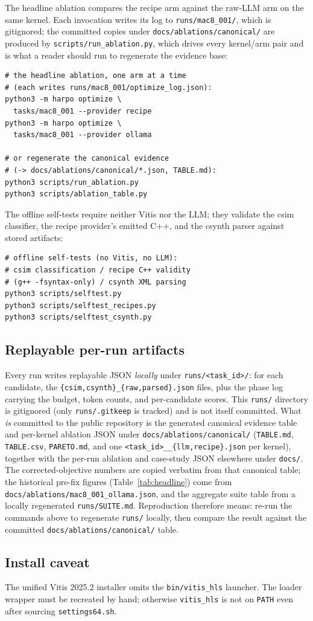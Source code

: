 The headline ablation compares the recipe arm against the raw-LLM arm on the
same kernel. Each invocation writes its log to \texttt{runs/mac8\_001/}, which is
gitignored; the committed copies under \texttt{docs/ablations/canonical/} are
produced by \texttt{scripts/run\_ablation.py}, which drives every kernel/arm pair
and is what a reader should run to regenerate the evidence base:

{\footnotesize
\begin{verbatim}
# the headline ablation, one arm at a time
# (each writes runs/mac8_001/optimize_log.json):
python3 -m harpo optimize \
  tasks/mac8_001 --provider recipe
python3 -m harpo optimize \
  tasks/mac8_001 --provider ollama

# or regenerate the canonical evidence
# (-> docs/ablations/canonical/*.json, TABLE.md):
python3 scripts/run_ablation.py
python3 scripts/ablation_table.py
\end{verbatim}}

The offline self-tests require neither Vitis nor the LLM; they validate the
csim classifier, the recipe provider's emitted C++, and the csynth parser
against stored artifacts:

{\footnotesize
\begin{verbatim}
# offline self-tests (no Vitis, no LLM):
# csim classification / recipe C++ validity
# (g++ -fsyntax-only) / csynth XML parsing
python3 scripts/selftest.py
python3 scripts/selftest_recipes.py
python3 scripts/selftest_csynth.py
\end{verbatim}}

\subsection{Replayable per-run artifacts}

Every run writes replayable JSON \emph{locally} under \texttt{runs/<task\_id>/}:
for each candidate, the \texttt{\{csim,csynth\}\_\{raw,parsed\}.json} files,
plus the phase log carrying the budget, token counts, and per-candidate
scores. This \texttt{runs/} directory is gitignored (only
\texttt{runs/.gitkeep} is tracked) and is not itself committed. What
\emph{is} committed to the public repository is the generated canonical
evidence table and per-kernel ablation JSON under
\texttt{docs/ablations/canonical/} (\texttt{TABLE.md}, \texttt{TABLE.csv},
\texttt{PARETO.md}, and one \texttt{<task\_id>\_\_\{llm,recipe\}.json} per
kernel), together with the per-run ablation and case-study JSON elsewhere under
\texttt{docs/}. The corrected-objective numbers are copied verbatim from that
canonical table; the historical pre-fix figures (Table~\ref{tab:headline}) come
from \texttt{docs/ablations/mac8\_001\_ollama.json}, and the aggregate suite
table from a locally regenerated \texttt{runs/SUITE.md}.
Reproduction therefore means: re-run the commands above to regenerate
\texttt{runs/} locally, then compare the result against the committed
\texttt{docs/ablations/canonical/} table.

\subsection{Install caveat}

The unified Vitis 2025.2 installer omits the \texttt{bin/vitis\_hls} launcher.
The loader wrapper must be recreated by hand; otherwise \texttt{vitis\_hls}
is not on \texttt{PATH} even after sourcing \texttt{settings64.sh}.

